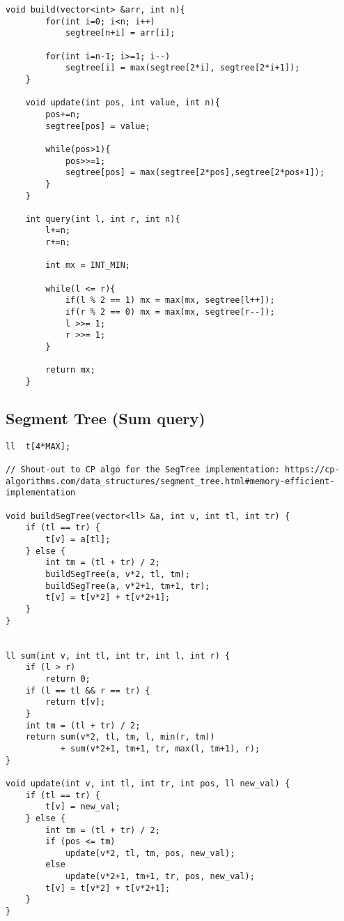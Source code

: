 \documentclass[10pt]{article}
\begin{document}
\begin{multicols*}{2}
\begin{lstlisting}[style=compactcpp]
    void build(vector<int> &arr, int n){
        for(int i=0; i<n; i++)
            segtree[n+i] = arr[i];
        
        for(int i=n-1; i>=1; i--)
            segtree[i] = max(segtree[2*i], segtree[2*i+1]);
    }

    void update(int pos, int value, int n){
        pos+=n;
        segtree[pos] = value;

        while(pos>1){
            pos>>=1;
            segtree[pos] = max(segtree[2*pos],segtree[2*pos+1]);
        }
    }

    int query(int l, int r, int n){
        l+=n;
        r+=n;

        int mx = INT_MIN;

        while(l <= r){
            if(l % 2 == 1) mx = max(mx, segtree[l++]);
            if(r % 2 == 0) mx = max(mx, segtree[r--]);  
            l >>= 1;
            r >>= 1;
        }

        return mx;
    }
\end{lstlisting}

\subsection{Segment Tree (Sum query)}

\begin{lstlisting}[style=compactcpp]
ll  t[4*MAX];
 
// Shout-out to CP algo for the SegTree implementation: https://cp-algorithms.com/data_structures/segment_tree.html#memory-efficient-implementation
 
void buildSegTree(vector<ll> &a, int v, int tl, int tr) {
    if (tl == tr) {
        t[v] = a[tl];
    } else {
        int tm = (tl + tr) / 2;
        buildSegTree(a, v*2, tl, tm);
        buildSegTree(a, v*2+1, tm+1, tr);
        t[v] = t[v*2] + t[v*2+1];
    }
}
 
 
ll sum(int v, int tl, int tr, int l, int r) {
    if (l > r) 
        return 0;
    if (l == tl && r == tr) {
        return t[v];
    }
    int tm = (tl + tr) / 2;
    return sum(v*2, tl, tm, l, min(r, tm))
           + sum(v*2+1, tm+1, tr, max(l, tm+1), r);
}
 
void update(int v, int tl, int tr, int pos, ll new_val) {
    if (tl == tr) {
        t[v] = new_val;
    } else {
        int tm = (tl + tr) / 2;
        if (pos <= tm)
            update(v*2, tl, tm, pos, new_val);
        else
            update(v*2+1, tm+1, tr, pos, new_val);
        t[v] = t[v*2] + t[v*2+1];
    }
}
\end{lstlisting}


\end{multicols*}
\end{document}
